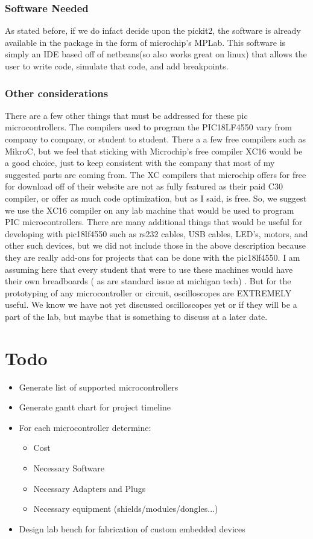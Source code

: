 \documentclass[12pt]{article}
\begin{document}
\subsubsection{Software Needed}
As stated before, if we do infact decide upon the pickit2, the software is already available in the
package in the form of microchip's MPLab.
This software is simply an IDE based off of netbeans(so also works great on linux) that allows the
user to write code, simulate that code, and add breakpoints.

\subsubsection{Other considerations}
There are a few other things that must be addressed for these pic microcontrollers. The compilers
used to program the PIC18LF4550 vary from company to company, or student to student. There a
a few free compilers such as MikroC, but we feel that sticking with Microchip's free compiler XC16
would be a good choice, just to keep consistent with the company that most of my suggested parts
are coming from. The XC compilers that microchip offers for free for download off of their website
are not as fully featured as their paid C30 compiler, or offer as much code optimization, but as I
said, is free. So, we suggest we use the XC16 compiler on any lab machine that would be used to
program PIC microcontrollers.
There are many additional things that would be useful for developing with pic18lf4550 such as
rs232 cables, USB cables, LED's, motors, and other such devices, but we did not include those
in the above description because they are really add-ons for projects that can be done with the
pic18lf4550.
I am assuming here that every student that were to use these machines would have their
own breadboards ( as are standard issue at michigan tech) . But for the prototyping of any
microcontroller or circuit, oscilloscopes are EXTREMELY useful. We know we have not yet
discussed oscilloscopes yet or if they will be a part of the lab, but maybe that is something to
discuss at a later date.


\section{Todo}
\begin{itemize}
\item Generate list of supported microcontrollers
\item Generate gantt chart for project timeline
\item For each microcontroller determine:
  \begin{itemize}
  \item Cost
  \item Necessary Software
  \item Necessary Adapters and Plugs
  \item Necessary equipment (shields/modules/dongles...)
  \end{itemize}
\item Design lab bench for fabrication of custom embedded devices
\end{itemize}
\end{document}
